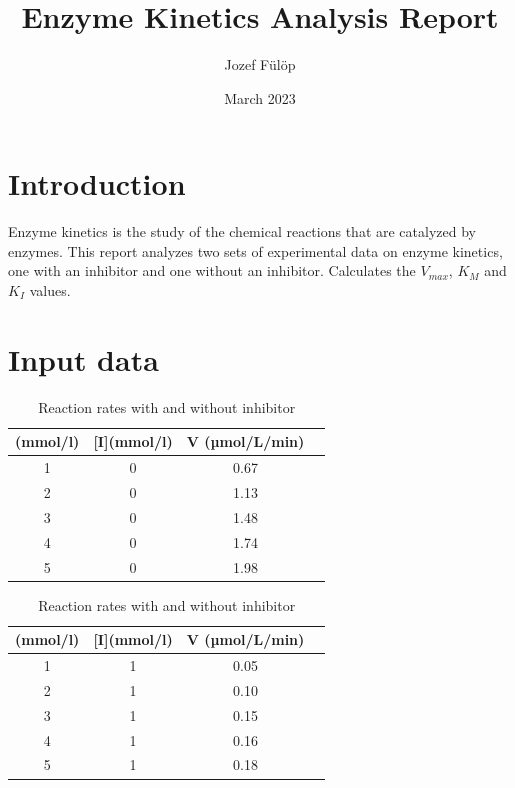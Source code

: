 \documentclass{article}
\title{Enzyme Kinetics Analysis Report}
\author{Jozef Fülöp}
\date{March 2023}
\begin{document}
\maketitle

\section{Introduction}
Enzyme kinetics is the study of the chemical
reactions that are catalyzed by enzymes.
This report analyzes two sets of experimental data on enzyme kinetics,
one with an inhibitor and one without an inhibitor.
Calculates the $V_{max}$, $K_M$ and $K_I$ values.

\section{Input data}

\begin{table}[htbp]
    \centering
    \begin{subtable}{\textwidth}
        \centering
        \caption{Reaction without inhibitor}
        \begin{tabular}{cccc}
            \hline
            [S](mmol/l) & [I](mmol/l) & V (µmol/L/min) \\
            \hline
            1           & 0           & 0.67           \\
            2           & 0           & 1.13           \\
            3           & 0           & 1.48           \\
            4           & 0           & 1.74           \\
            5           & 0           & 1.98           \\
            \hline
        \end{tabular}
    \end{subtable}
    \begin{subtable}{\textwidth}
        \centering
        \caption{Reaction with inhibitor}
        \begin{tabular}{cccc}
            \hline
            [S](mmol/l) & [I](mmol/l) & V (µmol/L/min) \\
            \hline
            1           & 1           & 0.05           \\
            2           & 1           & 0.10           \\
            3           & 1           & 0.15           \\
            4           & 1           & 0.16           \\
            5           & 1           & 0.18           \\
            \hline
        \end{tabular}
    \end{subtable}
    \caption{Reaction rates with and without inhibitor}
\end{table}
\end{document}
